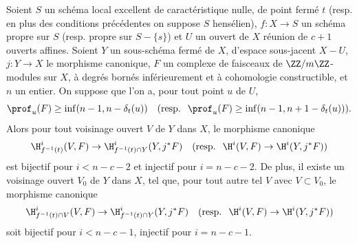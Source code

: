 \begin{proposition} \label{XIV.4.9}
Soient $S$ un sch\'ema local excellent de caract\'eristique nulle, de point ferm\'e $t$ (resp. en plus des conditions pr\'ec\'edentes on suppose $S$ hens\'elien), $f\colon X\to S$ un sch\'ema propre sur $S$ (resp. propre sur $S-\{ s\}$) et $U$ un ouvert de $X$ r\'eunion de $c+1$ ouverts affines. Soient $Y$ un sous-sch\'ema ferm\'e de $X$, d'espace sous-jacent $X-U$, $j\colon Y\to X$ le morphisme canonique, $F$ un complexe de faisceaux de $\ZZ/m\ZZ$-modules sur $X$, \`a degr\'es born\'es inf\'erieurement et \`a cohomologie constructible, et $n$ un entier. On suppose que l'on a, pour tout point $u$ de $U$,
$$
\prof_{u}(F)\geq\inf(n-1, n-\delta_{t}(u))\quad(\textrm{resp. }\;\prof_{u}(F)\geq\inf(n-1, n+1-\delta_{t}(u))).
$$
Alors pour tout voisinage ouvert $V$ de $Y$ dans $X$, le morphisme canonique
$$
\H_{f^{-1}(t)}^{i}(V, F)\to\H_{f^{-1}(t)\cap Y}^{i}(Y, j^{\ast}F)\quad(\textrm{resp. }\;\H^{i}(V, F)\to\H^{i}(Y, j^{\ast}F))$$
est bijectif pour $i<n-c-2$ et injectif pour $i=n-c-2$. De plus, il existe un voisinage ouvert $V_{0}$ de $Y$ dans $X$, tel que, pour tout autre tel $V$ avec $V\subset V_{0}$, le morphisme canonique
$$
\H_{f^{-1}(t)\cap V}^{i}(V, F)\to\H_{f^{-1}(t)\cap Y}^{i}(Y, j^{\ast}F)\quad(\textrm{resp. }\;\H^{i}(V, F)\to\H^{i}(Y, j^{\ast}F))$$
soit bijectif pour $i<n-c-1$, injectif pour $i=n-c-1$.
\end{proposition}

